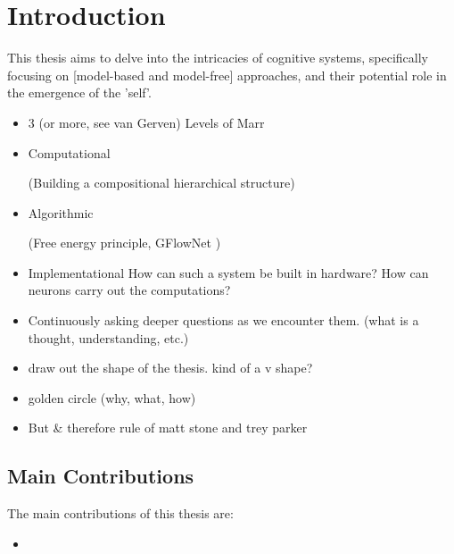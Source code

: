 \section{Introduction}
This thesis aims to delve into the intricacies of cognitive systems, specifically focusing on [model-based and model-free] approaches, and their potential role in the emergence of the 'self'.

\begin{itemize}
    \item 3 (or more, see van Gerven) Levels of Marr
    \item Computational
    
    (Building a compositional hierarchical structure)
    \item Algorithmic 
    
(Free energy principle, GFlowNet )
    \item Implementational How can such a system be built in
    hardware? How can neurons carry out the
    computations?
    \item Continuously asking deeper questions as we encounter them. (what is a thought, understanding, etc.)
    \item draw out the shape of the thesis. kind of a v shape?
    \item golden circle (why, what, how)
    \item But \& therefore rule of matt stone and trey parker 
\end{itemize}

\subsection{Main Contributions}
The main contributions of this thesis are: 
\begin{itemize}
    \item 
\end{itemize}
